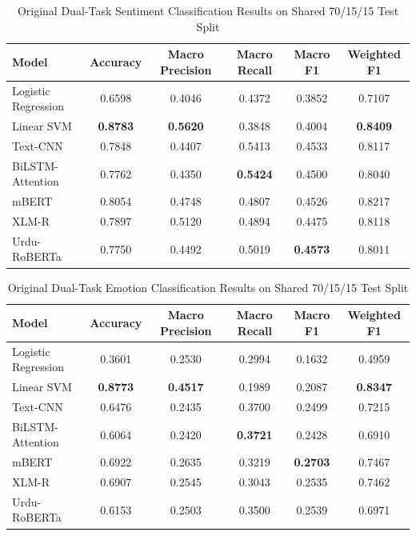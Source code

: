 \begin{table}[t]
\caption{Original Dual-Task Sentiment Classification Results on Shared 70/15/15 Test Split}
\label{tab:orig-sentiment-results}
\centering
\footnotesize
\setlength{\tabcolsep}{7pt}
\begin{tabular}{lccccc}
\toprule
Model & Accuracy & Macro Precision & Macro Recall & Macro F1 & Weighted F1 \\
\midrule
Logistic Regression & 0.6598 & 0.4046 & 0.4372 & 0.3852 & 0.7107 \\
Linear SVM          & \textbf{0.8783} & \textbf{0.5620} & 0.3848 & 0.4004 & \textbf{0.8409} \\
Text-CNN            & 0.7848 & 0.4407 & 0.5413 & 0.4533 & 0.8117 \\
BiLSTM-Attention    & 0.7762 & 0.4350 & \textbf{0.5424} & 0.4500 & 0.8040 \\
mBERT               & 0.8054 & 0.4748 & 0.4807 & 0.4526 & 0.8217 \\
XLM-R               & 0.7897 & 0.5120 & 0.4894 & 0.4475 & 0.8118 \\
Urdu-RoBERTa        & 0.7750 & 0.4492 & 0.5019 & \textbf{0.4573} & 0.8011 \\
\bottomrule
\end{tabular}
\end{table}

\begin{table}[t]
\caption{Original Dual-Task Emotion Classification Results on Shared 70/15/15 Test Split}
\label{tab:orig-emotion-results}
\centering
\footnotesize
\setlength{\tabcolsep}{7pt}
\begin{tabular}{lccccc}
\toprule
Model & Accuracy & Macro Precision & Macro Recall & Macro F1 & Weighted F1 \\
\midrule
Logistic Regression & 0.3601 & 0.2530 & 0.2994 & 0.1632 & 0.4959 \\
Linear SVM          & \textbf{0.8773} & \textbf{0.4517} & 0.1989 & 0.2087 & \textbf{0.8347} \\
Text-CNN            & 0.6476 & 0.2435 & 0.3700 & 0.2499 & 0.7215 \\
BiLSTM-Attention    & 0.6064 & 0.2420 & \textbf{0.3721} & 0.2428 & 0.6910 \\
mBERT               & 0.6922 & 0.2635 & 0.3219 & \textbf{0.2703} & 0.7467 \\
XLM-R               & 0.6907 & 0.2545 & 0.3043 & 0.2535 & 0.7462 \\
Urdu-RoBERTa        & 0.6153 & 0.2503 & 0.3500 & 0.2539 & 0.6971 \\
\bottomrule
\end{tabular}
\end{table}

